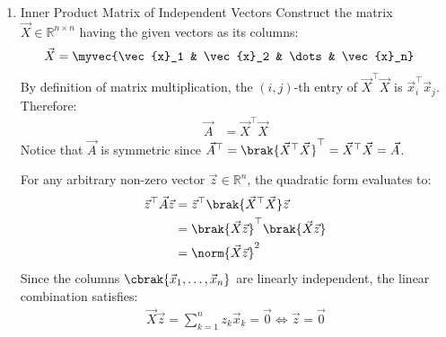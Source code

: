\begin{enumerate}[label=\thesubsection.\arabic*, ref=\thesubsection.\theenumi]
	\item Inner Product Matrix of Independent Vectors
	Construct the matrix $\vec{X} \in \mathbb{R}^{n \times n}$ having the given vectors as its columns:
	\begin{align}
		\vec{X} &= \myvec{\vec{x}_1 & \vec{x}_2 & \dots & \vec{x}_n}
	\end{align}
	By definition of matrix multiplication, the $(i, j)$-th entry of $\vec{X}^{\top}\vec{X}$ is $\vec{x}_i^{\top}\vec{x}_j$. Therefore:
	\begin{align}
		\vec{A} &= \vec{X}^{\top}\vec{X} \label{eq:DA2025-A-Gram}
	\end{align}
	Notice that $\vec{A}$ is symmetric since $\vec{A}^{\top} = \brak{\vec{X}^{\top}\vec{X}}^{\top} = \vec{X}^{\top}\vec{X} = \vec{A}$.
	
	For any arbitrary non-zero vector $\vec{z} \in \mathbb{R}^n$, the quadratic form evaluates to:
	\begin{align}
		\vec{z}^{\top}\vec{A}\vec{z} &= \vec{z}^{\top}\brak{\vec{X}^{\top}\vec{X}}\vec{z}
		\\
		&= \brak{\vec{X}\vec{z}}^{\top}\brak{\vec{X}\vec{z}}
		\\
		&= \norm{\vec{X}\vec{z}}^2 \label{eq:DA2025-quadratic-norm}
	\end{align}
	Since the columns $\cbrak{\vec{x}_1, \dots, \vec{x}_n}$ are linearly independent, the linear combination satisfies:
	\begin{align}
		\vec{X}\vec{z} = \sum_{k=1}^n z_k \vec{x}_k = \vec{0} \iff \vec{z} = \vec{0}
		\label{eq:DA2025-linear}
	\end{align}
	

\end{enumerate}
